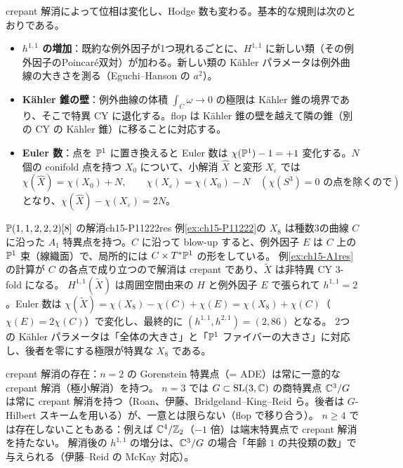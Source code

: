 crepant 解消によって位相は変化し、Hodge 数も変わる。基本的な規則は次のとおりである。
\begin{itemize}
\item \textbf{$h^{1,1}$ の増加}：既約な例外因子が1つ現れるごとに、$H^{1,1}$ に新しい類（その例外因子のPoincar\'e双対）が加わる。新しい類の K\"ahler パラメータは例外曲線の大きさを測る（Eguchi--Hanson の $a^2$）。
\item \textbf{K\"ahler 錐の壁}：例外曲線の体積 $\int_C\omega\to0$ の極限は K\"ahler 錐の境界であり、そこで特異 CY に退化する。flop は K\"ahler 錐の壁を越えて隣の錐（別の CY の K\"ahler 錐）に移ることに対応する。
\item \textbf{Euler 数}：点を $\mathbb{P}^1$ に置き換えると Euler 数は $\chi(\mathbb{P}^1) - 1 = +1$ 変化する。$N$ 個の conifold 点を持つ $X_0$ について、小解消 $\hat X$ と変形 $X_\varepsilon$ では
\[
\chi(\hat X) = \chi(X_0) + N,\qquad \chi(X_\varepsilon) = \chi(X_0) - N\quad(\chi(S^3) = 0\text{ の点を除くので})
\]
となり、$\chi(\hat X) - \chi(X_\varepsilon) = 2N$。
\end{itemize}

\begin{myex}{$\mathbb{P}(1,1,2,2,2)[8]$ の解消}{ch15-P11222res}
例\ref{ex:ch15-P11222}の $X_8$ は種数3の曲線 $C$ に沿った $A_1$ 特異点を持つ。$C$ に沿って blow-up すると、例外因子 $E$ は $C$ 上の $\mathbb{P}^1$ 束（線織面）で、局所的には $C\times T^*\mathbb{P}^1$ の形をしている。
例\ref{ex:ch15-A1res}の計算が $C$ の各点で成り立つので解消は crepant であり、$\tilde X$ は非特異 CY 3-fold になる。
$H^{1,1}(\tilde X)$ は周囲空間由来の $H$ と例外因子 $E$ で張られて $h^{1,1} = 2$。Euler 数は $\chi(\tilde X) = \chi(X_8) - \chi(C) + \chi(E) = \chi(X_8) + \chi(C)$（$\chi(E) = 2\chi(C)$）で変化し、最終的に $(h^{1,1},h^{2,1}) = (2,86)$ となる。
2つの K\"ahler パラメータは「全体の大きさ」と「$\mathbb{P}^1$ ファイバーの大きさ」に対応し、後者を零にする極限が特異な $X_8$ である。
\end{myex}

\begin{note}
crepant 解消の存在：$n=2$ の Gorenstein 特異点（= ADE）は常に一意的な crepant 解消（極小解消）を持つ。
$n=3$ では $G\subset\operatorname{SL}(3,\mathbb{C})$ の商特異点 $\mathbb{C}^3/G$ は常に crepant 解消を持つ（Roan、伊藤、Bridgeland--King--Reid ら。後者は $G$-Hilbert スキームを用いる）が、一意とは限らない（flop で移り合う）。
$n\ge4$ では存在しないこともある：例えば $\mathbb{C}^4/\mathbb{Z}_2$（$-1$ 倍）は端末特異点で crepant 解消を持たない。
解消後の $h^{1,1}$ の増分は、$\mathbb{C}^3/G$ の場合「年齢 $1$ の共役類の数」で与えられる（伊藤--Reid の McKay 対応）。
\end{note}

